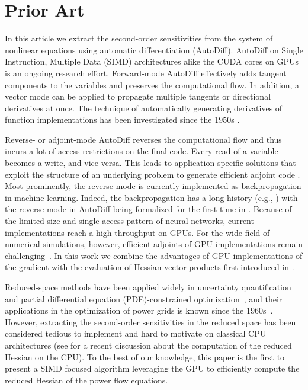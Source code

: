 \section{Prior Art}
\label{sec:priorart}
In this article we extract the second-order sensitivities from
the system of nonlinear equations using automatic differentiation (AutoDiff).
AutoDiff on Single Instruction, Multiple Data (SIMD) architectures alike the
CUDA cores on GPUs is an ongoing research effort.
Forward-mode AutoDiff effectively adds tangent components to the variables
and preserves the computational flow. In addition, a vector mode can be
applied to propagate multiple tangents or directional derivatives at once.
The technique of automatically generating derivatives of function
implementations has been investigated since the 1950s \cite{nolan1953analytical,beda1959programs}.

Reverse- or adjoint-mode AutoDiff reverses the computational flow and thus
incurs a lot of access restrictions on the final code. Every read of a
variable becomes a write, and vice versa. This leads to application-specific
solutions that exploit the structure of an underlying problem to generate
efficient adjoint code \cite{bluhdorn2020automat,grabner2008automatic,huckelheim2018parallelizable}.
Most prominently, the reverse mode is currently implemented as
backpropagation in machine learning. Indeed, the backpropagation has a long
history (e.g., \cite{bryson1962steepest})  with the reverse mode in AutoDiff
being formalized for the first time in \cite{linnainmaa1976taylor}. Because
of the  limited size and single access pattern of neural networks, current
implementations \cite{NEURIPS2019_9015,tensorflow2015-whitepaper,innes2018flux}
reach a high throughput on GPUs. For the wide field of numerical simulations,
however, efficient adjoints of GPU implementations remain challenging~\cite{10.1145/3458817.3476165}. In
this work we combine the advantages of GPU implementations of the gradient
with the evaluation of Hessian-vector products first introduced in \cite{pearlmutter1994fast}.

Reduced-space methods have been applied widely in
uncertainty quantification and partial differential equation (PDE)-constrained
optimization~\cite{biegler2003large}, and their applications in the optimization
of power grids is known since the 1960s~\cite{dommel1968optimal}.
However, extracting the second-order sensitivities in the reduced space
has been considered tedious to implement and hard to motivate on classical CPU architectures (see \cite{kardos2020reduced}
for a recent discussion about the computation of the reduced Hessian on the CPU).
To the best of our knowledge, this paper is the first to present a SIMD focused algorithm leveraging
the GPU to efficiently compute the reduced Hessian of the power flow
equations.

